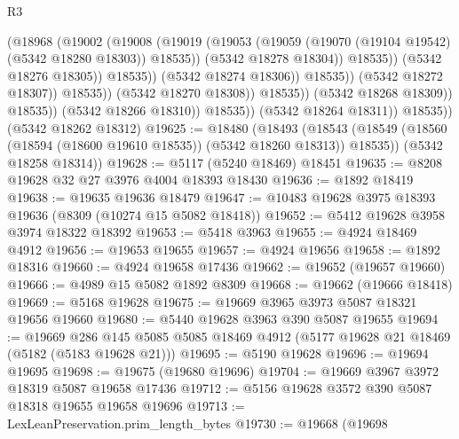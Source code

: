 \begin{lexlean}{R3}
\begin{coremodule}
                                            (@18968
                                              (@19002
                                                (@19008
                                                  (@19019
                                                    (@19053
                                                      (@19059
                                                        (@19070
                                                          (@19104 @19542)
                                                          (@5342 @18280 @18303))
                                                        @18535))
                                                    (@5342 @18278 @18304))
                                                  @18535))
                                              (@5342 @18276 @18305))
                                            @18535))
                                        (@5342 @18274 @18306))
                                      @18535))
                                  (@5342 @18272 @18307))
                                @18535))
                            (@5342 @18270 @18308))
                          @18535))
                      (@5342 @18268 @18309))
                    @18535))
                (@5342 @18266 @18310))
              @18535))
          (@5342 @18264 @18311))
        @18535))
    (@5342 @18262 @18312)
@19625 := @18480
    (@18493
      (@18543 (@18549 (@18560 (@18594 (@18600 @19610 @18535)) (@5342 @18260 @18313)) @18535))
      (@5342 @18258 @18314))
@19628 := @5117 (@5240 @18469) @18451
@19635 := @8208 @19628 @32 @27 @3976 @4004 @18393 @18430
@19636 := @1892 @18419
@19638 := @19635 @19636 @18479
@19647 := @10483 @19628 @3975 @18393 @19636 (@8309 (@10274 @15 @5082 @18418))
@19652 := @5412 @19628 @3958 @3974 @18322 @18392
@19653 := @5418 @3963
@19655 := @4924 @18469 @4912
@19656 := @19653 @19655
@19657 := @4924 @19656
@19658 := @1892 @18316
@19660 := @4924 @19658 @17436
@19662 := @19652 (@19657 @19660)
@19666 := @4989 @15 @5082 @1892 @8309
@19668 := @19662 (@19666 @18418)
@19669 := @5168 @19628
@19675 := @19669 @3965 @3973 @5087 @18321 @19656 @19660
@19680 := @5440 @19628 @3963 @390 @5087 @19655
@19694 := @19669
    @286
    @145
    @5085
    @5085
    @18469
    @4912
    (@5177 @19628 @21 @18469 (@5182 (@5183 @19628 @21)))
@19695 := @5190 @19628
@19696 := @19694 @19695
@19698 := @19675 (@19680 @19696)
@19704 := @19669 @3967 @3972 @18319 @5087 @19658 @17436
@19712 := @5156 @19628 @3572 @390 @5087 @18318 @19655 @19658 @19696
@19713 := LexLeanPreservation.prim_length_bytes
@19730 := @19668
    (@19698

\end{coremodule}
\end{lexlean}
